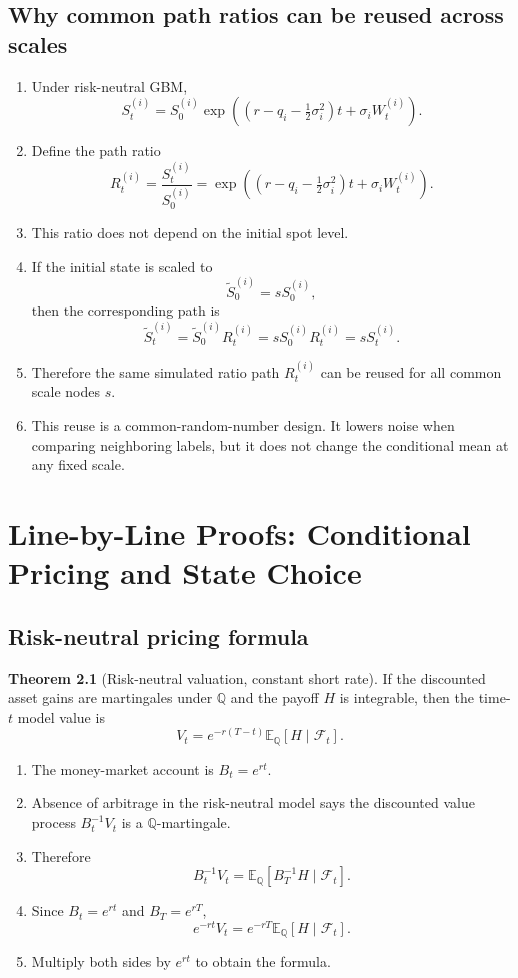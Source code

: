 \documentclass[11pt,oneside]{book}
\theoremstyle{definition}
\newtheorem{theorem}{Theorem}[chapter]
\newenvironment{proofsteps}
{\begin{enumerate}[label=\textbf{Line \arabic*.}, itemsep=0.35em]}
{\end{enumerate}}
\newcommand{\E}{\mathbb{E}}
\newcommand{\Q}{\mathbb{Q}}
\begin{document}
\section{Why common path ratios can be reused across scales}
\begin{proofsteps}
\item Under risk-neutral GBM,
\[
  S_t^{(i)}
  =
  S_0^{(i)}
  \exp\!\left(
    (r-q_i-\tfrac12\sigma_i^2)t+\sigma_i W_t^{(i)}
  \right).
\]
\item Define the path ratio
\[
  R_t^{(i)}
  =
  \frac{S_t^{(i)}}{S_0^{(i)}}
  =
  \exp\!\left(
    (r-q_i-\tfrac12\sigma_i^2)t+\sigma_i W_t^{(i)}
  \right).
\]
\item This ratio does not depend on the initial spot level.
\item If the initial state is scaled to
\[
  \widetilde S_0^{(i)}=sS_0^{(i)},
\]
then the corresponding path is
\[
  \widetilde S_t^{(i)}
  =
  \widetilde S_0^{(i)}R_t^{(i)}
  =
  sS_0^{(i)}R_t^{(i)}
  =
  sS_t^{(i)}.
\]
\item Therefore the same simulated ratio path \(R_t^{(i)}\) can be reused for
all common scale nodes \(s\).
\item This reuse is a common-random-number design. It lowers noise when
comparing neighboring labels, but it does not change the conditional mean at
any fixed scale.
\end{proofsteps}

\chapter{Line-by-Line Proofs: Conditional Pricing and State Choice}

\section{Risk-neutral pricing formula}
\begin{theorem}[Risk-neutral valuation, constant short rate]
If the discounted asset gains are martingales under \(\Q\) and the payoff \(H\) is integrable, then the time-\(t\) model value is
\[
  V_t=e^{-r(T-t)}\E_\Q[H\mid\mathcal F_t].
\]
\end{theorem}
\begin{proofsteps}
\item The money-market account is \(B_t=e^{rt}\).
\item Absence of arbitrage in the risk-neutral model says the discounted value process \(B_t^{-1}V_t\) is a \(\Q\)-martingale.
\item Therefore
\[
  B_t^{-1}V_t
  =
  \E_\Q[B_T^{-1}H\mid\mathcal F_t].
\]
\item Since \(B_t=e^{rt}\) and \(B_T=e^{rT}\),
\[
  e^{-rt}V_t=e^{-rT}\E_\Q[H\mid\mathcal F_t].
\]
\item Multiply both sides by \(e^{rt}\) to obtain the formula.
\end{proofsteps}
\end{document}
